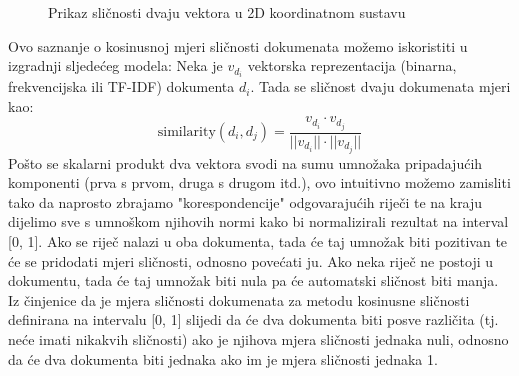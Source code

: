 \documentclass[times, utf8, zavrsni]{fer}
\begin{document}
\begin{figure}
\caption{Prikaz sličnosti dvaju vektora u 2D koordinatnom sustavu}
\end{figure}

Ovo saznanje o kosinusnoj mjeri sličnosti dokumenata možemo iskoristiti u izgradnji sljedećeg modela: Neka je $v_{d_i}$ vektorska reprezentacija (binarna, frekvencijska ili TF-IDF) dokumenta $d_{i}$. Tada se sličnost dvaju dokumenata mjeri kao:
\begin{equation}
{\displaystyle {\text{similarity}}(d_{i}, d_{j})}={\frac{v_{d_i} \cdot v_{d_j}}{||v_{d_i}|| \cdot ||v_{d_j}||}}
\end{equation}
Pošto se skalarni produkt dva vektora svodi na sumu umnožaka pripadajućih komponenti (prva s prvom, druga s drugom itd.), ovo intuitivno možemo zamisliti tako da naprosto zbrajamo "korespondencije" odgovarajućih riječi te na kraju dijelimo sve s umnoškom njihovih normi kako bi normalizirali rezultat na interval [0, 1]. Ako se riječ nalazi u oba dokumenta, tada će taj umnožak biti pozitivan te će se pridodati mjeri sličnosti, odnosno povećati ju. Ako neka riječ ne postoji u dokumentu, tada će taj umnožak biti nula pa će automatski sličnost biti manja. Iz činjenice da je mjera sličnosti dokumenata za metodu kosinusne sličnosti definirana na intervalu [0, 1] slijedi da će dva dokumenta biti posve različita (tj. neće imati nikakvih sličnosti) ako je njihova mjera sličnosti jednaka nuli, odnosno da će dva dokumenta biti jednaka ako im je mjera sličnosti jednaka 1.
\end{document}
